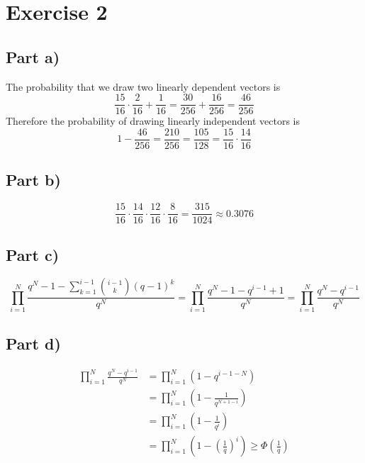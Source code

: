\documentclass[10pt,a4paper]{article}
\begin{document}
\section*{Exercise 2}

\subsection*{Part a)}

The probability that we draw two linearly dependent vectors is
\begin{equation*}
  \frac{15}{16} \cdot \frac{2}{16} + \frac{1}{16} = \frac{30}{256} + \frac{16}{256} = \frac{46}{256}
\end{equation*}
Therefore the probability of drawing linearly independent vectors is
\begin{equation*}
  1 - \frac{46}{256} = \frac{210}{256} = \frac{105}{128} = \frac{15}{16} \cdot \frac{14}{16}
\end{equation*}

\subsection*{Part b)}

\begin{equation*}
  \frac{15}{16} \cdot \frac{14}{16} \cdot \frac{12}{16} \cdot \frac{8}{16} = \frac{315}{1024} \approx 0.3076
\end{equation*}

\subsection*{Part c)}

\begin{equation*}
  \prod_{i = 1}^{N} \frac{q^{N} - 1 - \sum_{k = 1}^{i - 1} \binom{i - 1}{k} (q - 1)^{k}}{q^{N}} = \prod_{i = 1}^{N} \frac{q^{N} - 1 - q^{i - 1} + 1}{q^{N}} = \prod_{i = 1}^{N} \frac{q^{N} - q^{i - 1}}{q^{N}}
\end{equation*}

\subsection*{Part d)}

\begin{align*}
  \prod_{i = 1}^{N} \frac{q^{N} - q^{i - 1}}{q^{N}} & = \prod_{i = 1}^{N} \left( 1 - q^{i - 1 - N} \right)\\
                                                    & = \prod_{i = 1}^{N} \left( 1 - \frac{1}{q^{N + 1 - i}} \right)\\
                                                    & = \prod_{i = 1}^{N} \left( 1 - \frac{1}{q^{i}} \right)\\
                                                    & = \prod_{i = 1}^{N} \left( 1 - \left( \frac{1}{q} \right)^{i} \right) \ge \Phi\left( \frac{1}{q} \right)
\end{align*}
\end{document}
